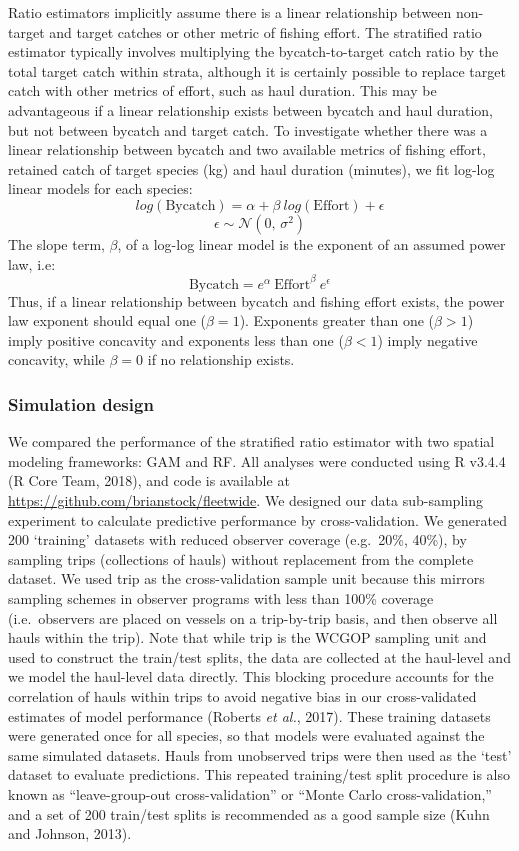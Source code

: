 \documentclass[]{article}
\begin{document}
Ratio estimators implicitly assume there is a linear relationship
between non-target and target catches or other metric of fishing effort.
The stratified ratio estimator typically involves multiplying the
bycatch-to-target catch ratio by the total target catch within strata,
although it is certainly possible to replace target catch with other
metrics of effort, such as haul duration. This may be advantageous if a
linear relationship exists between bycatch and haul duration, but not
between bycatch and target catch. To investigate whether there was a
linear relationship between bycatch and two available metrics of fishing
effort, retained catch of target species (kg) and haul duration
(minutes), we fit log-log linear models for each species:
\[ log(\text{Bycatch}) = \alpha + \beta \ log(\text{Effort}) + \epsilon\]
\[ \epsilon \sim \mathcal{N}(0,\,\sigma^{2})\] The slope term,
\(\beta\), of a log-log linear model is the exponent of an assumed power
law, i.e:
\[ \text{Bycatch} = e^\alpha \ \text{Effort}^{\beta} \ e^\epsilon\]
Thus, if a linear relationship between bycatch and fishing effort
exists, the power law exponent should equal one (\(\beta = 1\)).
Exponents greater than one (\(\beta > 1\)) imply positive concavity and
exponents less than one (\(\beta < 1\)) imply negative concavity, while
\(\beta = 0\) if no relationship exists.

\subsubsection{Simulation design}\label{simulation-design}

We compared the performance of the stratified ratio estimator with two
spatial modeling frameworks: GAM and RF. All analyses were conducted
using R v3.4.4 (R Core Team, 2018), and code is available at
\url{https://github.com/brianstock/fleetwide}. We designed our data
sub-sampling experiment to calculate predictive performance by
cross-validation. We generated 200 `training' datasets with reduced
observer coverage (e.g.~20\%, 40\%), by sampling trips (collections of
hauls) without replacement from the complete dataset. We used trip as
the cross-validation sample unit because this mirrors sampling schemes
in observer programs with less than 100\% coverage (i.e.~observers are
placed on vessels on a trip-by-trip basis, and then observe all hauls
within the trip). Note that while trip is the WCGOP sampling unit and
used to construct the train/test splits, the data are collected at the
haul-level and we model the haul-level data directly. This blocking
procedure accounts for the correlation of hauls within trips to avoid
negative bias in our cross-validated estimates of model performance
(Roberts \emph{et al.}, 2017). These training datasets were generated
once for all species, so that models were evaluated against the same
simulated datasets. Hauls from unobserved trips were then used as the
`test' dataset to evaluate predictions. This repeated training/test
split procedure is also known as ``leave-group-out cross-validation'' or
``Monte Carlo cross-validation,'' and a set of 200 train/test splits is
recommended as a good sample size (Kuhn and Johnson, 2013).
\end{document}

